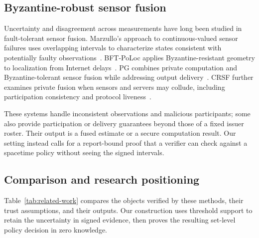 \subsection{Byzantine-robust sensor fusion}
Uncertainty and disagreement across measurements have long been studied in fault-tolerant sensor fusion. Marzullo's approach to continuous-valued sensor failures uses overlapping intervals to characterize states consistent with potentially faulty observations~\citep{Marzullo1990}. BFT-PoLoc applies Byzantine-resistant geometry to localization from Internet delays~\citep{BFTPoLoc}. PG combines private computation and Byzantine-tolerant sensor fusion while addressing output delivery~\citep{PG}. CRSF further examines private fusion when sensors and servers may collude, including participation consistency and protocol liveness~\citep{CRSF}.

These systems handle inconsistent observations and malicious participants; some also provide participation or delivery guarantees beyond those of a fixed issuer roster. Their output is a fused estimate or a secure computation result. Our setting instead calls for a report-bound proof that a verifier can check against a spacetime policy without seeing the signed intervals.

\subsection{Comparison and research positioning}
Table~\ref{tab:related-work} compares the objects verified by these methods, their trust assumptions, and their outputs. Our construction uses threshold support to retain the uncertainty in signed evidence, then proves the resulting set-level policy decision in zero knowledge.

